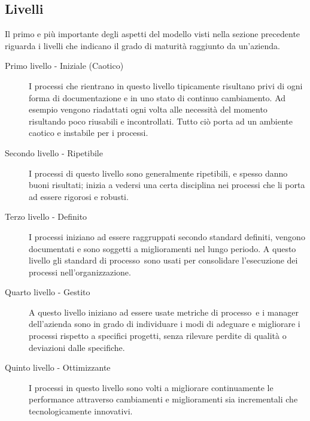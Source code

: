 \documentclass[../PianoDiQualifica.tex]{subfiles}
\begin{document}
\begin{appendices}
	\subsection{Livelli}
	Il primo e più importante degli aspetti del modello visti nella sezione precedente riguarda i livelli che indicano il grado di maturità raggiunto da un'azienda.
	\begin{description}
		\item[Primo livello - Iniziale (Caotico)] I processi che rientrano in questo livello tipicamente risultano privi di ogni forma di documentazione e in uno stato di continuo cambiamento. Ad esempio vengono riadattati ogni volta alle necessità del momento risultando poco riusabili e incontrollati. Tutto ciò porta ad un ambiente caotico e instabile per i processi.
		\item[Secondo livello - Ripetibile] I processi di questo livello sono generalmente ripetibili, e spesso danno buoni risultati; inizia a vedersi una certa disciplina nei processi che li porta ad essere rigorosi e robusti.
		\item[Terzo livello - Definito] I processi iniziano ad essere raggruppati secondo standard definiti, vengono documentati e sono soggetti a miglioramenti nel lungo periodo. A questo livello gli standard di processo\g\ sono usati per consolidare l'esecuzione dei processi nell'organizzazione.
		\item[Quarto livello - Gestito] A questo livello iniziano ad essere usate metriche di processo\g\ e i manager dell'azienda sono in grado di individuare i modi di adeguare e migliorare i processi rispetto a specifici progetti, senza rilevare perdite di qualità o deviazioni dalle specifiche.
		\item[Quinto livello - Ottimizzante] I processi in questo livello sono volti a migliorare continuamente le performance attraverso cambiamenti e miglioramenti sia incrementali che tecnologicamente innovativi.
	\end{description}
\end{appendices}
\end{document}
